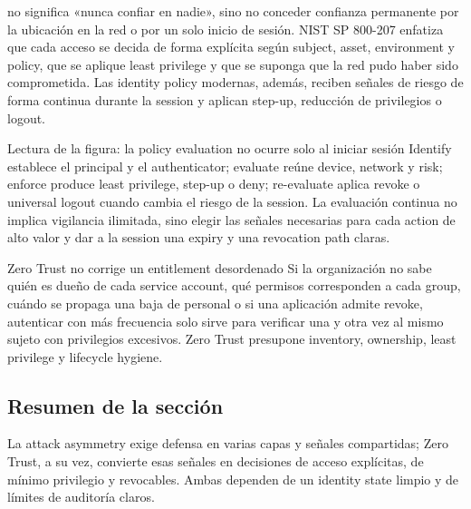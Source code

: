  no significa «nunca confiar en nadie», sino no conceder confianza permanente por la ubicación en la red o por un solo inicio de sesión. NIST SP 800-207 enfatiza que cada acceso se decida de forma explícita según subject, asset, environment y policy, que se aplique least privilege y que se suponga que la red pudo haber sido comprometida. Las identity policy modernas, además, reciben señales de riesgo de forma continua durante la session y aplican step-up, reducción de privilegios o logout.


\begin{knowledgebox}{Lectura de la figura: la policy evaluation no ocurre solo al iniciar sesión}
Identify establece el principal y el authenticator; evaluate reúne device, network y risk; enforce produce least privilege, step-up o deny; re-evaluate aplica revoke o universal logout cuando cambia el riesgo de la session. La evaluación continua no implica vigilancia ilimitada, sino elegir las señales necesarias para cada action de alto valor y dar a la session una expiry y una revocation path claras.
\end{knowledgebox}

\begin{warningbox}{Zero Trust no corrige un entitlement desordenado}
Si la organización no sabe quién es dueño de cada service account, qué permisos corresponden a cada group, cuándo se propaga una baja de personal o si una aplicación admite revoke, autenticar con más frecuencia solo sirve para verificar una y otra vez al mismo sujeto con privilegios excesivos. Zero Trust presupone inventory, ownership, least privilege y lifecycle hygiene.
\end{warningbox}

\subsection{Resumen de la sección}

La attack asymmetry exige defensa en varias capas y señales compartidas; Zero Trust, a su vez, convierte esas señales en decisiones de acceso explícitas, de mínimo privilegio y revocables. Ambas dependen de un identity state limpio y de límites de auditoría claros.
